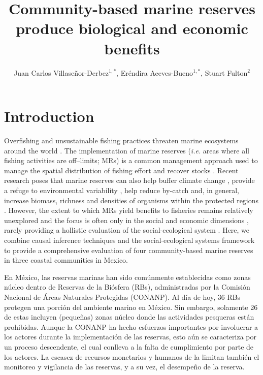 \documentclass{frontiersSCNS}
\def\firstAuthorLast{Villaseñor-Derbez {et~al.}}
\def\Authors{Juan Carlos Villaseñor-Derbez\(^{1,*}\), Eréndira
Aceves-Bueno\(^{1,*}\), Stuart Fulton\(^{2}\)}
\begin{document}
\onecolumn
{}

\title[Mexican marine reserves]{Community-based marine reserves produce biological and economic benefits} 

\author[\firstAuthorLast ]{\Authors} %
\address{} %
\correspondance{} %

\extraAuth{}

\maketitle



\section{Introduction}\label{introduction}

Overfishing and unsustainable fishing practices threaten marine
ecosystems around the world \citep{halpern_2008-dK,halpern_2017-Zi}. The
implementation of marine reserves (\emph{i.e.} areas where all fishing
activities are off--limits; MRs) is a common management approach used to
manage the spatial distribution of fishing effort and recover stocks
\citep{afflerbach_2014-HP,krueck_2017-J1,sala_2017-69}. Recent research
poses that marine reserves can also help buffer climate change
\citep{roberts_2017-J9}, provide a refuge to environmental variability
\citep{micheli_2012-EU}, help reduce by-catch \citep{hastings_2017-sm}
and, in general, increase biomass, richness and densities of organisms
within the protected regions
\citep{lester_2009-Ks,giakoumi_2017-V2,sala_2017-69}. However, the
extent to which MRs yield benefits to fisheries remains relatively
unexplored \citep{krueck_2017-J1} and the focus is often only in the
social and economic dimensions \citep{klein_2008,charles_2008}, rarely
providing a hollistic evaluation of the social-ecological system
\citep{halpern_2013,lpezangarita_2014,mascia_2017-m_}. Here, we combine
causal inference techniques \citep{depalma_2018} and the
social-ecological systems framework
\citep{ostrom_2009-hg,mascia_2017-m_} to provide a comprehensive
evaluation of four community-based marine reserves in three coastal
communities in Mexico.

En México, las reservas marinas han sido comúnmente establecidas como
zonas núcleo dentro de Reservas de la Biósfera (RBs), administradas por
la Comisión Nacional de Áreas Naturales Protegidas (CONANP). Al día de
hoy, 36 RBs protegen una porción del ambiente marino en México. Sin
embargo, solamente 26 de estas incluyen (pequeñas) zonas núcleo donde
las actividades pesqueras están prohibidas. Aunque la CONANP ha hecho
esfuerzos importantes por involucrar a los actores durante la
implementación de las reservas, esto aún se caracteriza por un proceso
descendente, el cual conlleva a la falta de cumplimiento por parte de
los actores. La escasez de recursos monetarios y humanos de la limitan
también el monitoreo y vigilancia de las reservas, y a su vez, el
desempeño de la reserva.
\end{document}
